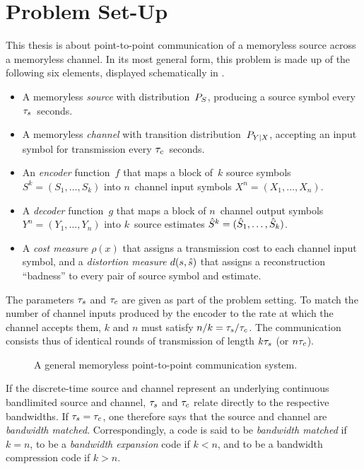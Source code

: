 \section{Problem Set-Up}\label{sec:setup}

This thesis is about point-to-point communication of a memoryless source across
a memoryless channel. In its most general form, this problem is made up of the
following six elements, displayed schematically in .
\begin{itemize}
  \item A memoryless \emph{source} with distribution~${P_S}$, producing a source
    symbol every ${\tau_s}$~seconds.
  \item A memoryless \emph{channel} with transition distribution~$P_{Y|X}$,
    accepting an input symbol for transmission every ${\tau_c}$~seconds.
  \item An \emph{encoder} function~$f$ that maps a block of~$k$ source symbols
    $S^k = (S_1, \dots, S_k)$ into $n$~channel input symbols $X^n = (X_1, \dots,
    X_n)$.
  \item A \emph{decoder} function~$g$ that maps a block of $n$~channel output
    symbols $Y^n = (Y_1, \dots, Y_n)$ into $k$~source estimates ${\hat{S}}^k = ({\hat{S}}_1,
    \dots, {\hat{S}}_k)$.
  \item A \emph{cost measure} $\rho(x)$ that assigns a transmission cost to each
    channel input symbol, and a \emph{distortion measure} $d(s,{\hat{s}})$ that
    assigns a reconstruction ``badness'' to every pair of source symbol and
    estimate.
\end{itemize}
The parameters ${\tau_s}$ and ${\tau_c}$ are given as part of the problem
setting. To match the number of channel inputs produced by the encoder to the
rate at which the channel accepts them, $k$ and $n$ must satisfy $n/k = {\tau_s} /
{\tau_c}$. The communication consists thus of identical rounds of transmission of
length $k{\tau_s}$ (or $n{\tau_c}$).


\begin{figure}
  \begin{center}
    
  \end{center}
  \caption{A general memoryless point-to-point communication system.}
  \label{fig:scgen}
\end{figure}

If the discrete-time source and channel represent an underlying continuous
bandlimited source and channel, ${\tau_s}$ and ${\tau_c}$ relate directly to
the respective bandwidths. If ${\tau_s} = {\tau_c}$, one therefore says that the source
and channel are \emph{bandwidth matched}. Correspondingly, a code is said to be
\emph{bandwidth matched} if $k=n$, to be a \emph{bandwidth expansion} code if $k
< n$, and to be a bandwidth compression code if $k > n$. 

